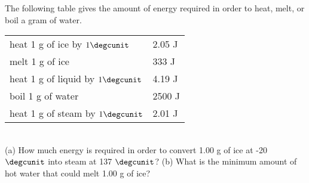         The following table gives the amount of energy required in order to
        heat, melt, or boil a gram of water.\\
        \begin{tabular}{ll}
        heat 1 g of ice by $1\degcunit$        & 2.05 J\\
        melt 1 g of ice                        & 333 J\\
        heat 1 g of liquid by $1\degcunit$ &         4.19 J\\
        boil 1 g of water                & 2500 J\\
        heat 1 g of steam by $1\degcunit$        & 2.01 J\\
        \end{tabular}\\
        (a) How much energy is required in order to convert 1.00 g of
        ice at -20 $\degcunit$ into steam at 137 $\degcunit$? \answercheck\hwendpart
        (b) What is the minimum amount of hot water that could melt 1.00 g
        of ice? \answercheck
